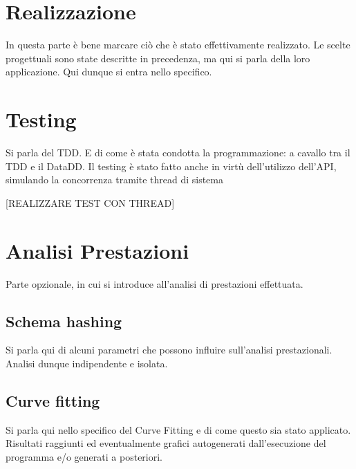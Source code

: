 \section{Realizzazione}

	In questa parte è bene marcare ciò che è stato effettivamente realizzato. Le scelte progettuali sono state descritte
	in precedenza, ma qui si parla della loro applicazione. Qui dunque si entra nello specifico.

\section{Testing}

	Si parla del TDD. E di come è stata condotta la programmazione: a cavallo tra il TDD e il DataDD.
	Il testing è stato fatto anche in virtù dell'utilizzo dell'API, simulando la concorrenza tramite thread di sistema
	
	[REALIZZARE TEST CON THREAD]

\section{Analisi Prestazioni}

	Parte opzionale, in cui si introduce all'analisi di prestazioni effettuata.
	
	\subsection{Schema hashing}
	
		Si parla qui di alcuni parametri che possono influire sull'analisi prestazionali. Analisi dunque indipendente e isolata.
		
	\subsection{Curve fitting}
	
		Si parla qui nello specifico del Curve Fitting e di come questo sia stato applicato. Risultati raggiunti ed eventualmente 
		grafici autogenerati dall'esecuzione del programma e/o generati a posteriori.